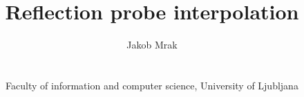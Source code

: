 

\title[Reflection probe interpolation]%
      {Reflection probe interpolation}

\author[Jakob Mrak]
{\parbox{\textwidth}{\centering Jakob Mrak
        }
        \\
{\parbox{\textwidth}{\centering 
       Faculty of information and computer science, University of Ljubljana
       }
}
}

%





